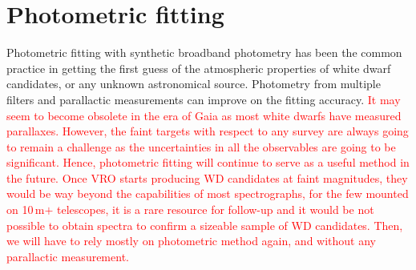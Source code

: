 \documentclass[fleqn,usenatbib]{rasti}
\begin{document}
\section{Photometric fitting}
Photometric fitting with synthetic broadband photometry has been the common
practice in getting the first guess of the atmospheric properties of white
dwarf candidates, or any unknown astronomical source. Photometry from multiple
filters and parallactic measurements can improve on the fitting accuracy.
\textcolor{red}{It may seem to become obsolete in the era of Gaia as most white
dwarfs have measured parallaxes. However, the faint targets with respect to any
survey are always going to remain a challenge as the uncertainties in all the
observables are going to be significant. Hence, photometric fitting will
continue to serve as a useful method in the future. Once VRO starts producing
WD candidates at faint magnitudes, they would be way beyond the capabilities
of most spectrographs, for the few mounted on 10\,m$+$ telescopes, it is a
rare resource for follow-up and it would be not possible to obtain spectra
to confirm a sizeable sample of WD candidates. Then, we will have to rely mostly
on photometric method again, and without any parallactic measurement.}
\end{document}
